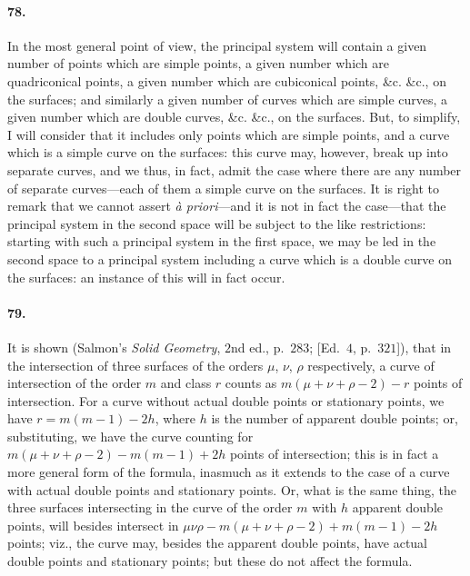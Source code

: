 \documentclass[11pt]{article}
\begin{document}
\paragraph{78.}
In the most general point of view, the principal system will contain a
given number of points which are simple points, a given number which are
quadriconical points, a given number which are cubiconical points, \&c.
\&c., on the surfaces; and similarly a given number of curves which are
simple curves, a given number which are double curves, \&c. \&c., on the
surfaces. But, to simplify, I will consider that it includes only points
which are simple points, and a curve which is a simple curve on the
surfaces: this curve may, however, break up into separate curves, and we
thus, in fact, admit the case where there are any number of separate
curves---each of them a simple curve on the surfaces. It is right to
remark that we cannot assert \textit{\`a priori}---and it is not in fact
the case---that the principal system in the second space will be subject
to the like restrictions: starting with such a principal system in the
first space, we may be led in the second space to a principal system
including a curve which is a double curve on the surfaces: an instance
of this will in fact occur.

\medskip

\paragraph{79.}
It is shown (Salmon's \textit{Solid Geometry}, $2$nd ed., p.~$283$;
[Ed.~$4$, p.~$321$]), that in the intersection of three surfaces of the
orders $\mu$, $\nu$, $\rho$ respectively, a curve of intersection of the
order $m$ and class $r$ counts as $m(\mu+\nu+\rho-2)-r$ points of
intersection. For a curve without actual double points or stationary
points, we have $r=m(m-1)-2h$, where $h$ is the number of apparent
double points; or, substituting, we have the curve counting for
$m(\mu+\nu+\rho-2)-m(m-1)+2h$ points of intersection; this is in fact a
more general form of the formula, inasmuch as it extends to the case of
a curve with actual double points and stationary points. Or, what is the
same thing, the three surfaces intersecting in the curve of the order
$m$ with $h$ apparent double points, will besides intersect in
$\mu\nu\rho-m(\mu+\nu+\rho-2)+m(m-1)-2h$ points; viz., the curve may,
besides the apparent double points, have actual double points and
stationary points; but these do not affect the formula.
\end{document}
